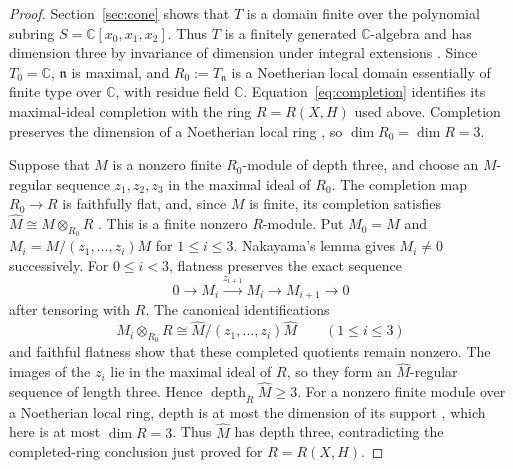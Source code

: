 \documentclass[11pt]{article}
\theoremstyle{remark}
\newcommand{\C}{\mathbb C}
\DeclareMathOperator{\depth}{depth}
\begin{document}
\begin{proof}
Section~\ref{sec:cone} shows that $T$ is a domain finite over the
polynomial subring $S=\C[x_0,x_1,x_2]$. Thus $T$ is a finitely
generated $\C$-algebra and has dimension three by invariance of dimension
under integral extensions \cite[Tag~00OK]{Stacks}. Since $T_0=\C$,
$\mathfrak n$ is maximal, and $R_0:=T_{\mathfrak n}$ is a Noetherian local
domain essentially of finite type over $\C$, with residue field $\C$.
Equation~\eqref{eq:completion} identifies
its maximal-ideal completion with the ring $R=R(X,H)$ used above. Completion
preserves the dimension of a Noetherian local ring
\cite[Tag~07NV]{Stacks}, so $\dim R_0=\dim R=3$.

Suppose that $M$ is a nonzero finite $R_0$-module of depth three, and choose
an $M$-regular sequence $z_1,z_2,z_3$ in the maximal ideal of $R_0$.
The completion map $R_0\to R$ is faithfully flat, and, since $M$ is finite,
its completion satisfies $\widehat M\cong M\otimes_{R_0}R$
\cite[Tags~00MC and 00MA]{Stacks}. This is a finite nonzero $R$-module.
Put $M_0=M$ and $M_i=M/(z_1,\ldots,z_i)M$ for $1\leq i\leq3$.
Nakayama's lemma gives $M_i\ne0$ successively. For $0\leq i<3$, flatness preserves the exact
sequence
\[
 0\longrightarrow M_i\xrightarrow{z_{i+1}}M_i
   \longrightarrow M_{i+1}\longrightarrow0
\]
after tensoring with $R$. The canonical identifications
\[
 M_i\otimes_{R_0}R
   \cong\widehat M/(z_1,\ldots,z_i)\widehat M\qquad(1\leq i\leq3)
\]
and faithful flatness show that these completed quotients remain nonzero.
The images of the $z_i$ lie in the maximal ideal of $R$, so they form an
$\widehat M$-regular sequence of length three. Hence $\depth_R\widehat M\geq3$.
For a nonzero finite module over a Noetherian local ring, depth is at most
the dimension of its support \cite[Tag~00LK]{Stacks}, which here is at most
$\dim R=3$. Thus $\widehat M$ has depth three, contradicting the completed-ring
conclusion just proved for $R=R(X,H)$.
\end{proof}



\end{document}
